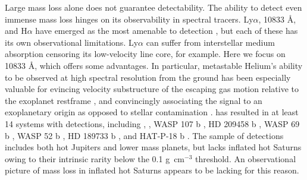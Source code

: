 \documentclass[twocolumn]{aastex631}
\begin{document}
Large mass loss alone does not guarantee detectability.  The ability to detect even immense mass loss hinges on its observability in spectral tracers.  Ly$\alpha$,  10833 \AA, and H$\alpha$ have emerged as the most amenable to detection \citep{2000ApJ...537..916S,2003Natur.422..143V,2012ApJ...751...86J,2018NatAs...2..714Y,2018ApJ...855L..11O,2018Natur.557...68S, 2022arXiv221116243D,2023MNRAS.518.4357O}, but each of these has its own observational limitations.  Ly$\alpha$ can suffer from interstellar medium  absorption censoring its low-velocity line core, for example.  Here we focus on  10833 \AA, which offers some advantages.  In particular, metastable Helium's ability to be observed at high spectral resolution from the ground has been especially valuable for evincing velocity substructure of the escaping gas motion relative to the exoplanet restframe \citep{2019A&A...629A.110A,2020ApJ...894...97N}, and convincingly associating the signal to an exoplanetary origin as opposed to stellar contamination \citep{2018AJ....156..189C}.   has resulted in at least 14 systems with detections, including  \citep{2020ApJ...894...97N, 2021A&A...647A.129L},  \citep{2022AJ....163...68Z}, WASP 107 b \citep{2019A&A...623A..58A,2020AJ....159..115K}, HD 209458 b \citep{2019A&A...629A.110A}, WASP 69 b \citep{2020AJ....159..278V}, WASP 52 b \citep{2020AJ....159..278V}, HD 189733 b \citep{2021A&A...647A.129L}, and HAT-P-18 b \citep{2021ApJ...909L..10P}.  The sample of detections includes both hot Jupiters and lower mass planets, but lacks inflated hot Saturns owing to their intrinsic rarity below the 0.1 g~cm$^{-3}$ threshold. An observational picture of mass loss in inflated hot Saturns appears to be lacking for this reason.
\end{document}
